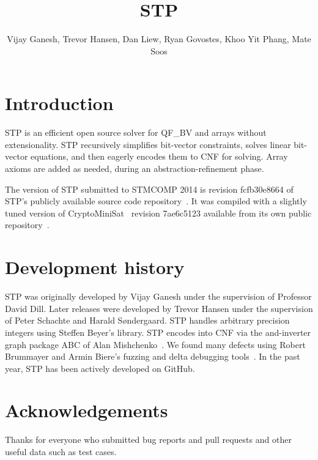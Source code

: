 \documentclass{llncs}
\begin{document}
\title{STP}
\author{Vijay Ganesh, Trevor Hansen, Dan Liew, Ryan Govostes, Khoo Yit Phang, Mate Soos}
\institute{}

\maketitle
\thispagestyle{empty}
\pagestyle{empty}

\section{Introduction}
STP\cite{Vijay:Thesis:2007} is an efficient open source solver for QF\_BV and arrays without extensionality. STP recursively simplifies bit-vector constraints, solves linear bit-vector equations, and then eagerly encodes them to CNF for solving. Array axioms are added as needed, during an abstraction-refinement phase.

The version of STP submitted to STMCOMP 2014 is revision fcfb30e8664 of STP's publicly available source code repository~\cite{STP:github}. It was compiled with a slightly tuned version of CryptoMiniSat~\cite{DBLP:conf/sat/SoosNC09} revision 7ae6c5123 available from its own public repository~\cite{CMS:github}.


\section{Development history}
STP was originally developed by Vijay Ganesh under the supervision of Professor David Dill. Later releases were developed by Trevor Hansen under the supervision of Peter Schachte and Harald Søndergaard. STP handles arbitrary precision integers using Steffen Beyer's library. STP encodes into CNF via the and-inverter graph package ABC of Alan Mishchenko~\cite{Brayton:2010:AAI:2144310.2144317}. We found many defects using Robert Brummayer and Armin Biere's fuzzing and delta debugging tools~\cite{Brummayer:2009:FDS:1670412.1670413}. In the past year, STP has been actively developed on GitHub.

\section*{Acknowledgements}
Thanks for everyone who submitted bug reports and pull requests and other useful data such as test cases.




\vfill
\pagebreak
\end{document}
